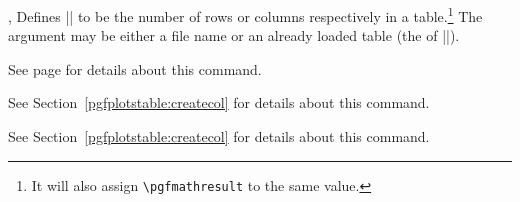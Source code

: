 \documentclass[a4paper]{ltxdoc}
\begin{document}
\begin{commandlist}{%
    \pgfplotstablegetrowsof{},
    \pgfplotstablegetcolsof{}%
}
    Defines |\pgfplotsretval| to be the number of rows or columns respectively
    in a table.\footnote{It will also assign \texttt{\textbackslash pgfmathresult}
    to the same value.} The argument may be either a file name or an already
    loaded table (the  of |\pgfplotstableread|).
\end{commandlist}

\begin{command}{\pgfplotstablevertcat{}}
    See page \pageref{table:vertcat} for details about this command.
\end{command}

\begin{command}{\pgfplotstablenew{}}
    See Section~\ref{pgfplotstable:createcol} for details about this command.
\end{command}
\begin{command}{\pgfplotstablecreatecol{}}
    See Section~\ref{pgfplotstable:createcol} for details about this command.
\end{command}
\end{document}
